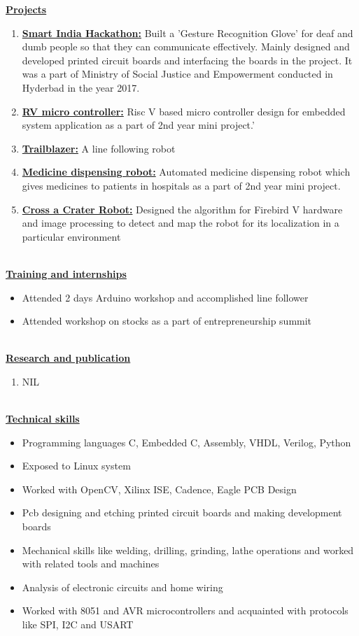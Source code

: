 \documentclass[10pt]{article}
\begin{document}
	\hfill 
	
	\underline{\textbf{\Large{Projects}}}
	\begin{enumerate}
		\item{\underline{\textbf{\large{Smart India Hackathon:}}} Built a 'Gesture Recognition Glove' for deaf and dumb people so that they can communicate effectively. Mainly designed and developed printed circuit boards and interfacing the boards in the project. It was a part of Ministry of Social Justice and Empowerment conducted in Hyderbad in the year 2017.}
		\item{\underline{\textbf{\large{RV micro controller:}}} Risc V based micro controller design for embedded system application as a part of 2nd year mini project.'}
		\item{\underline{\textbf{\large{Trailblazer:}}} A line following robot}
		\item{\underline{\textbf{\large{Medicine dispensing robot:}}} Automated medicine dispensing robot which gives medicines to patients in hospitals as a part of 2nd year mini project.}
		\item{\underline{\textbf{\large{Cross a Crater Robot:}}} Designed the algorithm for Firebird V hardware and image processing to detect and map the robot for its localization in a particular environment} 
	\end{enumerate}
	
	\hfill\\
	\underline{\textbf{\Large{Training and internships}}}
	\begin{itemize}
		\item{Attended 2 days Arduino workshop and accomplished line follower}
		\item{Attended workshop on stocks as a part of entrepreneurship summit}
	\end{itemize}
	
	\hfill\\
	\underline{\textbf{\Large{Research and publication}}}
	\begin{enumerate}
		\item{NIL}
	\end{enumerate}

	\hfill\\
	\underline{\textbf{\Large{Technical skills}}}
	\begin{itemize}
		\item{Programming languages C, Embedded C, Assembly, VHDL, Verilog, Python}
		\item{Exposed to Linux system}
		\item{Worked with OpenCV, Xilinx ISE, Cadence, Eagle PCB Design}					
		\item{Pcb designing and etching printed circuit boards and making development boards}
		\item{Mechanical skills like welding, drilling, grinding, lathe operations and worked with related tools and machines}
		\item{Analysis of electronic circuits and home wiring}
		\item{Worked with 8051 and AVR microcontrollers and acquainted with protocols like SPI, I2C and USART}
	\end{itemize}
\end{document}
